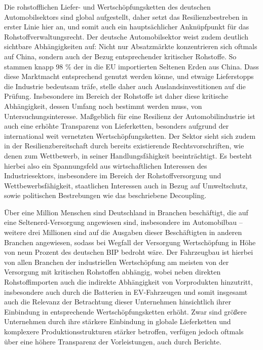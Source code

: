 \documentclass[12pt,a4paper,oneside]{book} %
\begin{document}
Die rohstofflichen Liefer- und Wertschöpfungsketten des deutschen Automobilsektors sind global aufgestellt, daher setzt das Resilienzbestreben in erster Linie hier an, und somit auch ein hauptsächlicher Anknüpfpunkt für das Rohstoffverwaltungsrecht. Der deutsche Automobilsektor weist zudem deutlich sichtbare Abhängigkeiten auf: Nicht nur Absatzmärkte konzentrieren sich oftmals auf China, sondern auch der Bezug entsprechender kritischer Rohstoffe. So stammen knapp 98 \% der in die EU importierten Seltenen Erden aus China.\autocite[4]{gaus_rare_2021} Dass diese Marktmacht entsprechend genutzt werden könne, und etwaige Lieferstopps die Industrie bedeutsam träfe, stelle daher auch Auslandsinvestitionen auf die Prüfung.\autocite[64]{becker_vom_2023} Insbesondere im Bereich der Rohstoffe ist daher diese kritische Abhängigkeit, dessen Umfang noch bestimmt werden muss, von Untersuchungsinteresse. Maßgeblich für eine Resilienz der Automobilindustrie ist auch eine erhöhte Transparenz von Lieferketten, besonders aufgrund der international weit vernetzten Wertschöpfungsketten.\autocite[9]{kagermann_resilienz_2021} Der Sektor sieht sich zudem in der Resilienzbereitschaft durch bereits existierende Rechtsvorschriften, wie denen zum Wettbewerb, in seiner Handlungsfähigkeit beeinträchtigt.\autocite[19]{kagermann_resilienz_2021} Es besteht hierbei also ein Spannungsfeld aus wirtschaftlichen Interessen des Industriesektors, insbesondere im Bereich der Rohstoffversorgung und Wettbewerbsfähigkeit, staatlichen Interessen auch in Bezug auf Umweltschutz, sowie politischen Bestrebungen wie das beschriebene Decoupling.

Über eine Million Menschen sind Deutschland in Branchen beschäftigt, die auf eine Seltenerd-Versorgung angewiesen sind, insbesondere im Automobilbau -- weitere drei Millionen sind auf die Ausgaben dieser Beschäftigten in anderen Branchen angewiesen, sodass bei Wegfall der Versorgung Wertschöpfung in Höhe von neun Prozent des deutschen BIP bedroht wäre.\autocite{McKinsey fünf Bausteine} Der Fahrzeugbau ist hierbei von allen Branchen der industriellen Wertschöpfung am meisten von der Versorgung mit kritischen Rohstoffen abhängig, wobei neben direkten Rohstoffimporten auch die indirekte Abhängigkeit von Vorprodukten hinzutritt, insbesondere auch durch die Batterien in EV-Fahrzeugen und somit insgesamt auch die Relevanz der Betrachtung dieser Unternehmen hinsichtlich ihrer Einbindung in entsprechende Wertschöpfungsketten erhöht.\autocite{IW-Trends_2026-2-6_Neligan_et_al_Rohstoffe, S. 105} Zwar sind größere Unternehmen durch ihre stärkere Einbindung in globale Lieferketten und komplexere Produktionsstrukturen stärker betroffen, verfügen jedoch oftmals über eine höhere Transparenz der Vorleistungen, auch durch Berichte.\autocite{IW-Trends_2026-2-6_Neligan_et_al_Rohstoffe, S. 107}
\end{document}
